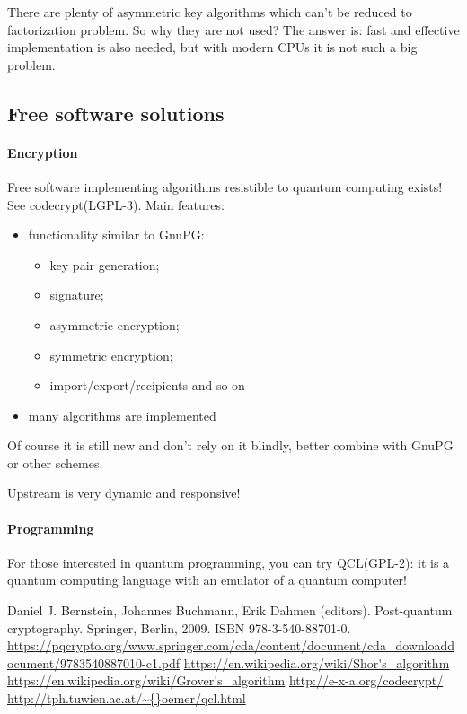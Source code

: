 \documentclass[10pt, a5paper]{article}
\begin{document}
There are plenty of asymmetric key algorithms which can't be reduced to factorization problem. So why they are not used? The answer is: fast and effective implementation is also needed, but with modern CPUs it is not such a big problem.

\subsection*{Free software solutions}

\paragraph{Encryption}

Free software implementing algorithms resistible to quantum computing exists! See codecrypt\footnotemark[4] (LGPL-3). Main features:

\begin{itemize}
  \item functionality similar to GnuPG:\begin{itemize}
  \item key pair generation;
  \item signature;
  \item asymmetric encryption;
  \item symmetric encryption;
  \item import/export/recipients and so on
\end{itemize}


  \item many algorithms are implemented
\end{itemize}

Of course it is still new and don't rely on it blindly, better combine with GnuPG or other schemes.

Upstream is very dynamic and responsive!

\paragraph{Programming}

For those interested in quantum programming, you can try QCL\footnotemark[5] (GPL-2): it is a quantum computing language with an emulator of a quantum computer!

\begin{thebibliography}{99}
Daniel J. Bernstein, Johannes Buchmann, Erik Dahmen (editors). Post-quantum cryptography. Springer, Berlin, 2009. ISBN 978-3-540-88701-0. \url{https://pqcrypto.org/www.springer.com/cda/content/document/cda\_downloaddocument/9783540887010-c1.pdf}
\url{https://en.wikipedia.org/wiki/Shor's\_algorithm}
\url{https://en.wikipedia.org/wiki/Grover's\_algorithm}
\url{http://e-x-a.org/codecrypt/}
\url{http://tph.tuwien.ac.at/\~{}oemer/qcl.html}
\end{thebibliography}
\end{document}
